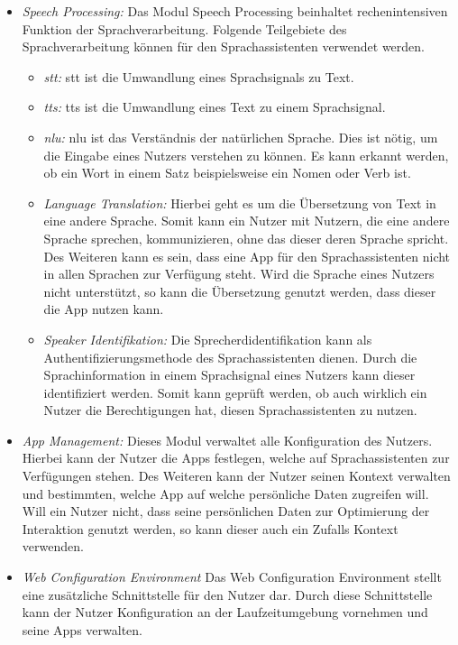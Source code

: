 \begin{itemize}
	\item \textsl{Speech Processing:} Das Modul Speech Processing beinhaltet rechenintensiven Funktion der Sprachverarbeitung. Folgende Teilgebiete des Sprachverarbeitung können für den Sprachassistenten verwendet werden.
	\begin{itemize}
		\item \textsl{\ac{stt}:} \ac{stt} ist die Umwandlung eines Sprachsignals zu Text.
		\item \textsl{\ac{tts}:} \ac{tts} ist die Umwandlung eines Text zu einem Sprachsignal.
		\item \textsl{\ac{nlu}:} \ac{nlu} ist das Verständnis der natürlichen Sprache. Dies ist nötig, um die Eingabe eines Nutzers verstehen zu können. Es kann erkannt werden, ob ein Wort in einem Satz beispielsweise ein Nomen oder Verb ist. 
		\item \textsl{Language Translation:} Hierbei geht es um die Übersetzung von Text in eine andere Sprache. Somit kann ein Nutzer mit Nutzern, die eine andere Sprache sprechen, kommunizieren, ohne das dieser deren Sprache spricht. Des Weiteren kann es sein, dass eine App für den Sprachassistenten nicht in allen Sprachen zur Verfügung steht. Wird die Sprache eines Nutzers nicht unterstützt, so kann die Übersetzung genutzt werden, dass dieser die App nutzen kann.
		\item \textsl{Speaker Identifikation:} Die Sprecherdidentifikation kann als Authentifizierungsmethode des Sprachassistenten dienen. Durch die Sprachinformation in einem Sprachsignal eines Nutzers kann dieser identifiziert werden. Somit kann geprüft werden, ob auch wirklich ein Nutzer die Berechtigungen hat, diesen Sprachassistenten zu nutzen.
	\end{itemize}
	\item \textsl{App Management: } Dieses Modul verwaltet alle Konfiguration des Nutzers. Hierbei kann der Nutzer die Apps festlegen, welche auf Sprachassistenten zur Verfügungen stehen. Des Weiteren kann der Nutzer seinen Kontext verwalten und bestimmten, welche App auf welche persönliche Daten zugreifen will. Will ein Nutzer nicht, dass seine persönlichen Daten zur Optimierung der Interaktion genutzt werden, so kann dieser auch ein Zufalls Kontext verwenden.
	\item \textsl{Web Configuration Environment} Das Web Configuration Environment stellt eine zusätzliche Schnittstelle für den Nutzer dar. Durch diese Schnittstelle kann der Nutzer Konfiguration an der Laufzeitumgebung vornehmen und seine Apps verwalten. 
\end{itemize}





